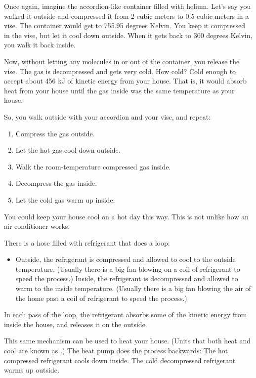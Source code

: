 Once again, imagine the accordion-like container filled with helium. Let's say you walked it outside and compressed it from 2 cubic meters to 0.5 cubic meters in a vise. The container would get to 755.95 degrees Kelvin. You keep it compressed in the vise, but let it cool down outside. When it gets back to 300 degrees Kelvin, you walk it back inside.

Now, without letting any molecules in or out of the container, you release the vise. The gas is decompressed and gets very cold. How cold? Cold enough to accept about 456 kJ of kinetic energy from your house. That is, it would absorb heat from your house until the gas inside was the same temperature as your house.

So, you walk outside with your accordion and your vise, and repeat:
\begin{enumerate}
\item Compress the gas outside.
\item Let the hot gas cool down outside.
\item Walk the room-temperature compressed gas inside.
\item Decompress the gas inside.
\item Let the cold gas warm up inside.
\end{enumerate}

You could keep your house cool on a hot day this way. This is not unlike how an air conditioner works.

There is a hose filled with refrigerant that does a loop: 
\begin{itemize}
\item Outside, the refrigerant is compressed and allowed to cool to the outside temperature. (Usually there is a big fan blowing on a coil of refrigerant to speed the process.)
Inside, the refrigerant is decompressed and allowed to warm to the inside temperature. (Usually there is a big fan blowing the air of the home past a coil of refrigerant to speed the process.)
\end{itemize}

In each pass of the loop, the refrigerant absorbs some of the kinetic energy from inside the house, and releases it on the outside.

This same mechanism can be used to heat your house. (Units that both heat and cool are known as .) 
The heat pump does the process backwards: The hot compressed refrigerant cools down inside. The cold decompressed refrigerant warms up outside.


